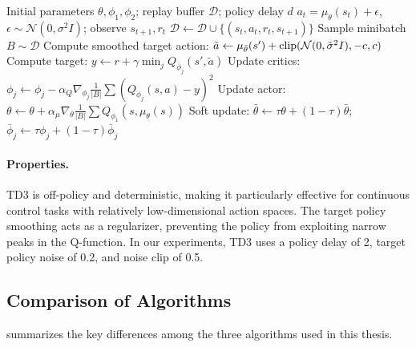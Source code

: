 \begin{algorithm}[htbp]
\caption{Twin Delayed DDPG (TD3)}
\label{alg:td3}
\begin{algorithmic}[1]
\Require Initial parameters $\theta, \phi_1, \phi_2$; replay buffer $\mathcal{D}$; policy delay $d$
    \State $a_t = \mu_\theta(s_t) + \epsilon$, \; $\epsilon \sim \mathcal{N}(0, \sigma^2 I)$; observe $s_{t+1}, r_t$
    \State $\mathcal{D} \gets \mathcal{D} \cup \{(s_t, a_t, r_t, s_{t+1})\}$
\EndFor
{}
    \State Sample minibatch $B \sim \mathcal{D}$
    \State Compute smoothed target action: $\tilde{a} \gets \mu_{\bar{\theta}}(s') + \operatorname{clip}(\mathcal{N}(0, \tilde{\sigma}^2 I), -c, c)$
    \State Compute target: $y \gets r + \gamma \min_j Q_{\bar{\phi}_j}(s', \tilde{a})$
    \State Update critics: $\phi_j \gets \phi_j - \alpha_Q \nabla_{\phi_j} \frac{1}{|B|} \sum (Q_{\phi_j}(s,a) - y)^2$
        \State Update actor: $\theta \gets \theta + \alpha_\mu \nabla_\theta \frac{1}{|B|} \sum Q_{\phi_1}(s, \mu_\theta(s))$
        \State Soft update: $\bar{\theta} \gets \tau\theta + (1{-}\tau)\bar{\theta}$; \; $\bar{\phi}_j \gets \tau\phi_j + (1{-}\tau)\bar{\phi}_j$
    \EndIf
\EndFor
\end{algorithmic}
\end{algorithm}

\paragraph{Properties.} TD3 is off-policy and deterministic, making it particularly effective for continuous control tasks with relatively low-dimensional action spaces. The target policy smoothing acts as a regularizer, preventing the policy from exploiting narrow peaks in the Q-function. In our experiments, TD3 uses a policy delay of 2, target policy noise of 0.2, and noise clip of 0.5.

\subsection{Comparison of Algorithms}

 summarizes the key differences among the three algorithms used in this thesis.

